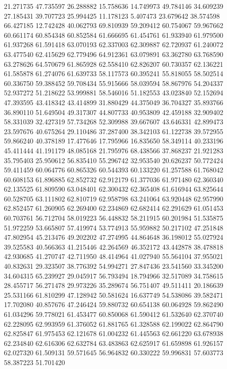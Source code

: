 21.271735
47.735597
26.288882
15.758636
14.749973
49.784146
34.609239
27.185431
39.707723
25.994425
11.178123
5.407473
23.679642
38.574598
66.427185
12.742428
40.062793
69.810939
59.209412
60.754067
59.967662
60.661174
60.854348
60.852584
61.666695
61.454761
61.933940
61.979500
61.937268
61.591418
63.070193
62.337003
62.309887
62.720937
61.240072
63.477540
62.415629
62.779496
64.912361
63.079891
63.362780
63.768590
63.278626
64.570679
61.865928
62.558410
62.826207
60.730357
62.136221
61.585878
61.274076
61.639733
58.117573
60.395241
55.818055
58.502514
60.336750
59.388452
59.708434
55.915666
58.039594
58.867976
54.204337
52.937272
51.218622
53.999881
58.546016
51.182553
43.023840
52.152694
47.393595
43.418342
43.414899
31.880429
44.375049
36.704327
35.893766
36.890110
51.649504
49.317307
44.807733
40.953809
42.459188
32.909402
58.331039
32.427319
57.734268
52.309988
39.667607
43.646331
42.899473
23.597676
40.675264
29.110486
37.287400
38.342103
61.122738
39.572955
59.866240
40.378189
17.477646
17.795966
16.835650
58.349114
40.233196
45.411444
41.191179
48.085168
21.795976
68.438566
37.868237
21.921283
35.795403
25.950612
56.835410
55.296742
32.953540
20.626237
50.772424
59.411459
60.064776
60.865326
60.544393
60.133220
61.257588
61.768042
60.608153
61.896885
62.852732
62.912179
61.377036
61.971480
62.360340
62.135525
61.809590
63.048401
62.300432
62.365408
61.616944
63.825644
60.528705
63.111802
62.810719
62.958798
63.241064
63.920448
62.957990
62.852457
61.260905
62.269400
62.234869
62.682414
62.291629
61.051453
60.703761
56.712704
58.019223
56.448832
58.211915
60.201984
51.535875
51.972259
53.665807
57.419974
53.774913
55.959882
50.217102
47.251848
47.802954
45.213476
49.202202
47.274995
44.864648
36.198012
55.027924
39.525583
40.566363
41.215446
42.264569
46.352172
43.442878
38.478818
42.930685
41.270747
42.711950
48.414964
41.027940
55.564104
37.955021
40.832631
29.323507
38.776392
54.994271
27.847436
23.541560
33.345200
34.604315
65.239927
29.045917
56.793494
18.794966
32.517089
34.758615
28.455717
56.271478
29.973226
35.289674
56.751407
49.511411
20.186639
25.531166
61.810299
47.128942
50.581624
16.637749
54.538086
39.582471
17.702080
40.857676
47.246424
59.880732
60.654138
60.064928
59.862490
61.034296
59.778021
61.453477
60.850068
61.590412
61.532640
62.370740
62.228095
62.993959
61.376052
61.881765
61.328588
62.199022
62.864790
62.825847
61.975453
62.121678
61.004232
61.445563
62.661220
63.678938
62.234840
62.616306
62.632784
63.483863
62.625917
61.659898
61.926157
62.027320
61.509131
59.571645
56.964832
60.330222
59.996831
57.603773
58.387223
51.701420
